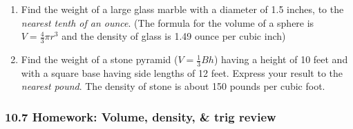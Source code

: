 \documentclass[12pt, twoside]{article}
\begin{document}
\begin{enumerate}
\newpage

  \item Find the weight of a large glass marble with a diameter of 1.5 inches, to the \emph{nearest tenth of an ounce}. (The formula for the volume of a sphere is $V=\frac{4}{3}\pi r^3$ and the density of glass is 1.49 ounce per cubic inch)  \vspace{9cm}


  \item Find the weight of a stone pyramid ($V=\frac{1}{3}Bh$) having a height of 10 feet and with a square base having side lengths of 12 feet. Express your result to the \emph{nearest pound}. The density of stone is about 150 pounds per cubic foot.


  \end{enumerate}
  \newpage
  \setcounter{page}{1}
\subsubsection*{10.7 Homework: Volume, density, \& trig review}
\end{document}
